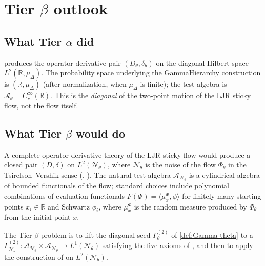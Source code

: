 \documentclass[11pt,reqno]{amsart}
\theoremstyle{plain}
\theoremstyle{definition}
\theoremstyle{remark}
\newcommand{\R}{\mathbb{R}}
\newcommand{\cA}{\mathcal A}
\newcommand{\cN}{\mathcal N}
\newcommand{\Dth}{D_{\theta}}
\newcommand{\divth}{\delta_{\theta}}
\begin{document}
\section{Tier \texorpdfstring{$\beta$}{beta} outlook}\label{sec:tier-beta}

\subsection{What Tier \texorpdfstring{$\alpha$}{alpha} did}\label{sec:beta-recap}

 produces the operator-derivative pair
$(\Dth,\divth)$ on the diagonal Hilbert space
$L^{2}(\R,\mu_{\Delta})$. The probability space underlying the
GammaHierarchy construction is $(\R,\mu_{\Delta})$ (after
normalization, when $\mu_{\Delta}$ is finite); the test algebra
is $\cA_{\theta}=C_{c}^{\infty}(\R)$. This is the
\emph{diagonal} of the two-point motion of the LJR sticky flow,
not the flow itself.

\subsection{What Tier \texorpdfstring{$\beta$}{beta} would do}\label{sec:beta-target}

A complete operator-derivative theory of the LJR sticky flow
would produce a closed pair $(D,\delta)$ on $L^{2}(\cN_{\theta})$,
where $\cN_{\theta}$ is the noise of the flow $\Phi_{\theta}$
in the Tsirelson--Vershik sense
(\cite{Tsirelson2004,LeJanRaimond2004},
\cite[Def.~2.4]{PrimitiveDivergence}). The natural test algebra
$\cA_{\cN_{\theta}}$ is a cylindrical algebra of bounded
functionals of the flow; standard choices include polynomial
combinations of evaluation functionals
$F(\Phi)=\langle\mu_{x}^{\Phi},\phi\rangle$ for finitely many
starting points $x_{i}\in\R$ and Schwartz $\phi_{i}$, where
$\mu_{x}^{\Phi}$ is the random measure produced by
$\Phi_{\theta}$ from the initial point $x$.

The Tier $\beta$ problem is to lift the diagonal seed
$\Gamma^{(2)}_{\theta}$ of \cref{def:Gamma-theta} to a
$\Gamma^{(2)}_{\cN_{\theta}}\colon\cA_{\cN_{\theta}}\times\cA_{\cN_{\theta}}\to L^{1}(\cN_{\theta})$
satisfying the five axioms of
\cite[Ass.~2.4]{GammaHierarchyDivergence}, and then to apply the
construction of \cite{GammaHierarchyDivergence} on
$L^{2}(\cN_{\theta})$.
\end{document}
